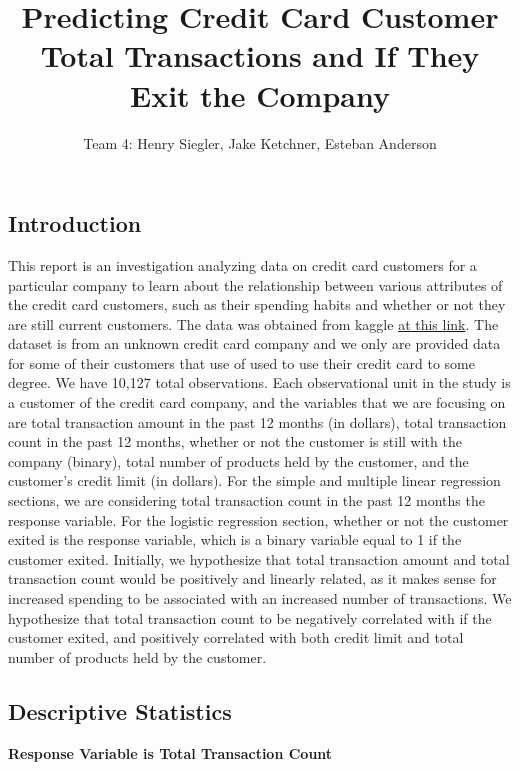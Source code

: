\documentclass[
]{article}
\title{Predicting Credit Card Customer Total Transactions and If They
Exit the Company}
\author{Team 4: Henry Siegler, Jake Ketchner, Esteban Anderson}
\date{}
\begin{document}
\maketitle

\hypertarget{introduction}{%
\subsection{Introduction}\label{introduction}}

This report is an investigation analyzing data on credit card customers
for a particular company to learn about the relationship between various
attributes of the credit card customers, such as their spending habits
and whether or not they are still current customers. The data was
obtained from kaggle
\href{https://www.kaggle.com/code/atillazkaymak/credit-card-customer-churn-prediction/data?select=BankChurners.csv}{at
this link}. The dataset is from an unknown credit card company and we
only are provided data for some of their customers that use of used to
use their credit card to some degree. We have 10,127 total observations.
Each observational unit in the study is a customer of the credit card
company, and the variables that we are focusing on are total transaction
amount in the past 12 months (in dollars), total transaction count in
the past 12 months, whether or not the customer is still with the
company (binary), total number of products held by the customer, and the
customer's credit limit (in dollars). For the simple and multiple linear
regression sections, we are considering total transaction count in the
past 12 months the response variable. For the logistic regression
section, whether or not the customer exited is the response variable,
which is a binary variable equal to 1 if the customer exited. Initially,
we hypothesize that total transaction amount and total transaction count
would be positively and linearly related, as it makes sense for
increased spending to be associated with an increased number of
transactions. We hypothesize that total transaction count to be
negatively correlated with if the customer exited, and positively
correlated with both credit limit and total number of products held by
the customer.

\hypertarget{descriptive-statistics}{%
\subsection{Descriptive Statistics}\label{descriptive-statistics}}

\textbf{Response Variable is Total Transaction Count}
\end{document}
